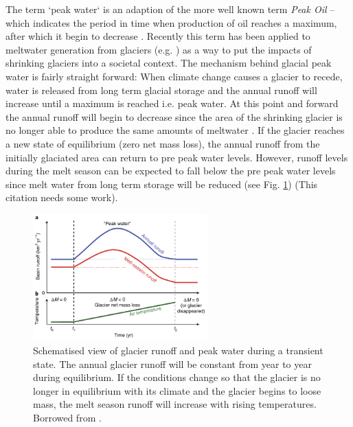 \documentclass[12pt, a4paper]{article}
\begin{document}
The term `peak water` is an adaption of the more well known term \emph{Peak Oil}
-- which indicates the period in time when production of oil reaches a maximum,
after which it begin to decrease \parencite{gleickPeakWaterLimits2010}. Recently
this term has been applied to meltwater generation from glaciers (e.g.
\cite{hussGlobalscaleHydrologicalResponse2018}) as a way to put the impacts of
shrinking glaciers into a societal context. The mechanism behind glacial peak
water is fairly straight forward: When climate change causes a glacier to
recede, water is released from long term glacial storage and the annual runoff
will increase until a maximum is reached i.e. peak water. At this point and
forward the annual runoff will begin to decrease since the area of the shrinking
glacier is no longer able to produce the same amounts of meltwater 
\parencite{janssonConceptGlacierStorage2003}. If the glacier reaches a new state
of equilibrium (zero net mass loss), the annual runoff from the initially
glaciated area can return to pre peak water levels. However, runoff levels
during the melt season can be expected to fall below the pre peak water levels
since melt water from long term storage will be reduced
\parencite{hussGlobalscaleHydrologicalResponse2018,
ragettliContrastingClimateChange2016, immerzeelRisingRiverFlows2013} (see Fig.
\ref{fig:peak_water}) (This citation needs some work). 
\begin{figure}[h]
    \centering
    \includegraphics[width=0.6\textwidth]{../peak_water.png}
    \caption{Schematised view of glacier runoff and peak water during a
    transient state. The annual glacier runoff will be constant from year to
    year during equilibrium. If the conditions change so that the glacier is no
    longer in equilibrium with its climate and the glacier begins to loose mass,
    the melt season runoff will increase with rising temperatures.
    Borrowed from \textcite{hussGlobalscaleHydrologicalResponse2018}.}
    \label{fig:peak_water}
\end{figure}
\end{document}
